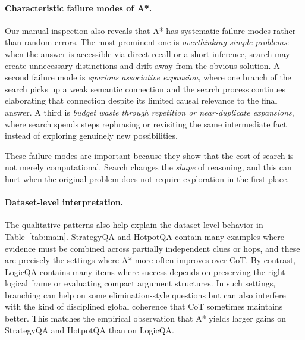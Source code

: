 \documentclass[11pt]{article}
\begin{document}
\paragraph{Characteristic failure modes of A*.}
Our manual inspection also reveals that A* has systematic failure modes rather than random errors. The most prominent one is \emph{overthinking simple problems}: when the answer is accessible via direct recall or a short inference, search may create unnecessary distinctions and drift away from the obvious solution. A second failure mode is \emph{spurious associative expansion}, where one branch of the search picks up a weak semantic connection and the search process continues elaborating that connection despite its limited causal relevance to the final answer. A third is \emph{budget waste through repetition or near-duplicate expansions}, where search spends steps rephrasing or revisiting the same intermediate fact instead of exploring genuinely new possibilities.

These failure modes are important because they show that the cost of search is not merely computational. Search changes the \emph{shape} of reasoning, and this can hurt when the original problem does not require exploration in the first place.

\paragraph{Dataset-level interpretation.}
The qualitative patterns also help explain the dataset-level behavior in Table~\ref{tab:main}. StrategyQA and HotpotQA contain many examples where evidence must be combined across partially independent clues or hops, and these are precisely the settings where A* more often improves over CoT. By contrast, LogicQA contains many items where success depends on preserving the right logical frame or evaluating compact argument structures. In such settings, branching can help on some elimination-style questions but can also interfere with the kind of disciplined global coherence that CoT sometimes maintains better. This matches the empirical observation that A* yields larger gains on StrategyQA and HotpotQA than on LogicQA.

\end{document}
